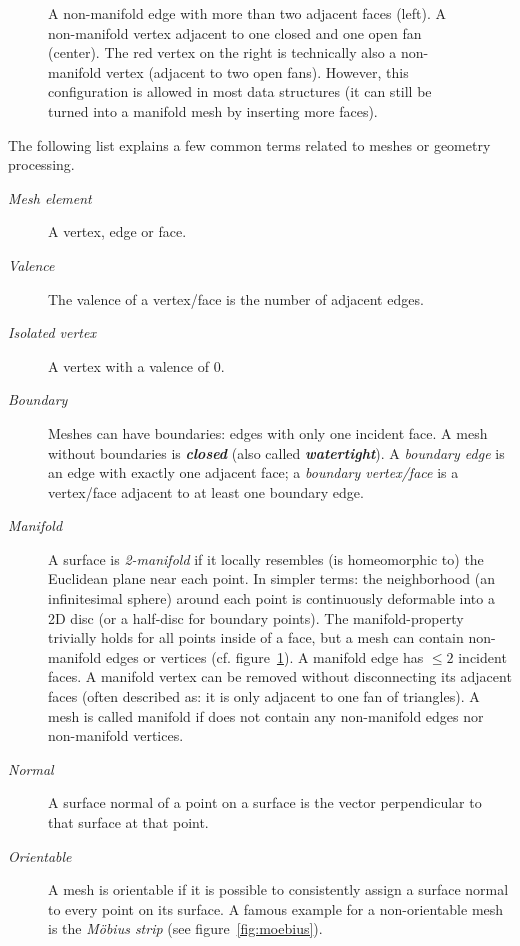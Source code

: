 \begin{figure}[t]
  
  \caption{
    A non-manifold edge with more than two adjacent faces (left).
    A non-manifold vertex adjacent to one closed and one open fan (center).
    The red vertex on the right is technically also a non-manifold vertex (adjacent to two open fans).
    However, this configuration is allowed in most data structures (it can still be turned into a manifold mesh by inserting more faces).}
  \label{fig:non-manifold}
\end{figure}

\newpage
The following list explains a few common terms related to meshes or geometry processing.

\begin{description}
  \item [\emph{Mesh element}] A vertex, edge or face.
  \item [\emph{Valence}] The valence of a vertex/face is the number of adjacent edges.
  \item [\emph{Isolated vertex}] A vertex with a valence of 0.
  \item [\emph{Boundary}] Meshes can have boundaries: edges with only one incident face.
  A mesh without boundaries is \textbf{\emph{closed}} (also called \textbf{\emph{watertight}}).
  A \emph{boundary edge} is an edge with exactly one adjacent face; a \emph{boundary vertex/face} is a vertex/face adjacent to at least one boundary edge.
  \item [\emph{Manifold}] A surface is \emph{2-manifold} if it locally resembles (is homeomorphic to) the Euclidean plane near each point.
  In simpler terms: the neighborhood (an infinitesimal sphere) around each point is continuously deformable into a 2D disc (or a half-disc for boundary points).
  The manifold-property trivially holds for all points inside of a face, but a mesh can contain non-manifold edges or vertices (cf. figure~\ref{fig:non-manifold}).
  A manifold edge has $\le 2$ incident faces.
  A manifold vertex can be removed without disconnecting its adjacent faces (often described as: it is only adjacent to one fan of triangles).
  A mesh is called manifold if does not contain any non-manifold edges nor non-manifold vertices.
  \item [\emph{Normal}] A surface normal of a point on a surface is the vector perpendicular to that surface at that point.
  \item [\emph{Orientable}] A mesh is orientable if it is possible to consistently assign a surface normal to every point on its surface.
  A famous example for a non-orientable mesh is the \emph{Möbius strip} (see figure~\ref{fig:moebius}).
\end{description}

